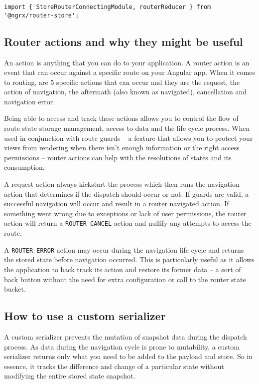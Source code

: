 \begin{verbatim}
import { StoreRouterConnectingModule, routerReducer } from '@ngrx/router-store';
\end{verbatim}

\subsection{Router actions and why they might be useful}
An action is anything that you can do to your application. A router action is an
event that can occur against a specific route on your Angular app. When it comes
to routing, are 5 specific actions that can occur and they are the request, the
action of navigation, the aftermath (also known as navigated), cancellation and
navigation error.

Being able to access and track these actions allows you to control the flow of
route state storage management, access to data and the life cycle process. When
used in conjunction with route guards – a feature that allows you to protect
your views from rendering when there isn’t enough information or the right
access permissions – router actions can help with the resolutions of states and
its consumption.

A request action always kickstart the process which then runs the navigation
action that determines if the dispatch should occur or not. If guards are valid,
a successful navigation will occur and result in a router navigated action. If
something went wrong due to exceptions or lack of user permissions, the router
action will return a \texttt{ROUTER\_CANCEL} action and nullify any attempts to
access the route.

A \texttt{ROUTER\_ERROR} action may occur during the navigation life cycle and
returns the stored state before navigation occurred. This is particularly useful
as it allows the application to back track its action and restore its former
data – a sort of back button without the need for extra configuration or call
to the router state bucket.

\subsection{How to use a custom serializer}

A custom serializer prevents the mutation of snapshot data during the dispatch
process. As data during the navigation cycle is prone to mutability, a custom
serializer returns only what you need to be added to the payload and store. So
in essence, it tracks the difference and change of a particular state without
modifying the entire stored state snapshot.

